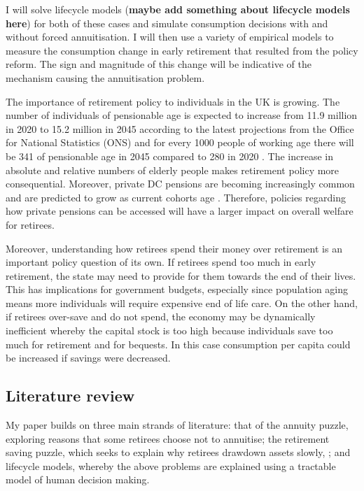 \documentclass[12pt]{article}
\begin{document}
I will solve lifecycle models (\textbf{maybe add something about lifecycle
    models here}) for both of these cases and simulate consumption decisions with
and without forced annuitisation. I will then use a variety of empirical models
to measure the consumption change in early retirement that resulted from the
policy reform. The sign and magnitude of this change will be indicative of the
mechanism causing the annuitisation problem.


The importance of retirement policy to individuals in the UK is growing. The
number of individuals of pensionable age is expected to increase from 11.9
million in 2020 to 15.2 million in 2045 according to the latest projections from
the Office for National Statistics (ONS) and for every 1000 people of working
age there will be 341 of pensionable age in 2045 compared to 280 in 2020
\cite{ons_population_predictions_2020}. The increase in absolute and relative
numbers of elderly people makes retirement policy more consequential. Moreover,
private DC pensions are becoming increasingly common and are predicted to grow
as current cohorts age \cite{cribb_karjalainen_ifs_2023}. Therefore, policies
regarding how private pensions can be accessed will have a larger impact on
overall welfare for retirees.

Moreover, understanding how retirees spend their money over retirement is an
important policy question of its own. If retirees spend too much in early
retirement, the state may need to provide for them towards the end of their
lives. This has implications for government budgets, especially since population
aging means more individuals will require expensive end of life care. On the
other hand, if retirees over-save and do not spend, the economy may be
dynamically inefficient whereby the capital stock is too high because
individuals save too much for retirement and for bequests. In this case
consumption per capita could be increased if savings were decreased.


\subsection{Literature review}
My paper builds on three main strands of literature: that of the annuity puzzle,
exploring reasons that some retirees choose not to annuitise; the retirement
saving puzzle, which seeks to explain why retirees drawdown assets slowly, ; and
lifecycle models, whereby the above problems are explained using a tractable
model of human decision making.
\end{document}
